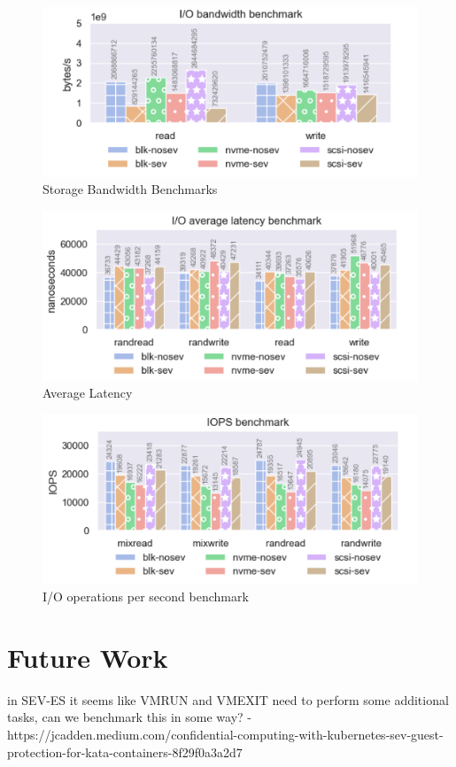 \documentclass[twocolumn]{article}
\begin{document}
\begin{figure}
    \centering
    \includegraphics[width=1\columnwidth]{img/bw.png}
    \caption{Storage Bandwidth Benchmarks}
\end{figure}
\begin{figure}
    \centering
    \includegraphics[width=1\columnwidth]{img/al.png}
    \caption{Average Latency}
\end{figure}
\begin{figure}
    \centering
    \includegraphics[width=1\columnwidth]{img/iops.png}
    \caption{I/O operations per second benchmark}
\end{figure}


\section{Future Work}
in SEV-ES it seems like VMRUN and VMEXIT need to perform some additional tasks, can we benchmark this in some way?
- https://jcadden.medium.com/confidential-computing-with-kubernetes-sev-guest-protection-for-kata-containers-8f29f0a3a2d7
\end{document}
